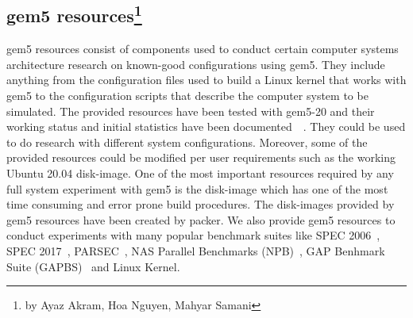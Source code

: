 \subsection[gem5 resources]{gem5 resources\footnote{by Ayaz Akram, Hoa Nguyen, Mahyar Samani}}

gem5 resources consist of components used to conduct certain computer systems architecture
research on known-good configurations using gem5. They include anything from the configuration
files used to build a Linux kernel that works with gem5 to the configuration scripts that
describe the computer system to be simulated. The provided resources have been tested with gem5-20
and their working status and initial statistics have been documented~\cite{benchmark_status}~\cite{resources-repo}.
They could be used to do research with different system configurations. Moreover, some of the
provided resources could be modified per user requirements such as the working Ubuntu 20.04 disk-image.
One of the most important resources required by any full system experiment with gem5 is the disk-image
which has one of the most time consuming and error prone build procedures. The disk-images provided by
gem5 resources have been created by packer. We also provide gem5 resources to conduct experiments with many
popular benchmark suites like SPEC 2006~\cite{spec06}, SPEC 2017~\cite{spec17}, PARSEC~\cite{parsec},
NAS Parallel Benchmarks (NPB)~\cite{npb}, GAP Benhmark Suite (GAPBS)~\cite{gapbs} and Linux Kernel.